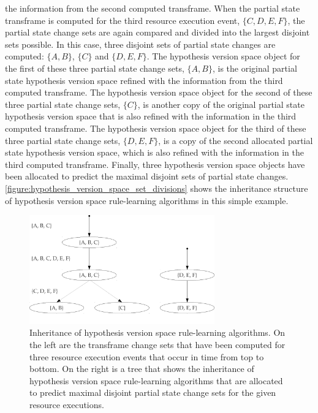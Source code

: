 the information from the second computed transframe.  When the partial
state transframe is computed for the third resource execution event,
$\{C, D, E, F\}$, the partial state change sets are again compared and
divided into the largest disjoint sets possible.  In this case, three
disjoint sets of partial state changes are computed: $\{A, B\}$,
$\{C\}$ and $\{D, E, F\}$.  The hypothesis version space object for
the first of these three partial state change sets, $\{A, B\}$, is the
original partial state hypothesis version space refined with the
information from the third computed transframe.  The hypothesis
version space object for the second of these three partial state
change sets, $\{C\}$, is another copy of the original partial state
hypothesis version space that is also refined with the information in
the third computed transframe.  The hypothesis version space object
for the third of these three partial state change sets, $\{D, E, F\}$,
is a copy of the second allocated partial state hypothesis version
space, which is also refined with the information in the third
computed transframe.  Finally, three hypothesis version space objects
have been allocated to predict the maximal disjoint sets of partial
state changes.
{\mbox{\autoref{figure:hypothesis_version_space_set_divisions}}} shows
the inheritance structure of hypothesis version space rule-learning
algorithms in this simple example.
\begin{figure}
\centering
\includegraphics[width=8cm]{gfx/hypothesis_version_space_set_divisions}
\caption[Inheritance of hypothesis version space rule-learning
  algorithms.]{Inheritance of hypothesis version space rule-learning
  algorithms.  On the left are the transframe change sets that have
  been computed for three resource execution events that occur in time
  from top to bottom.  On the right is a tree that shows the
  inheritance of hypothesis version space rule-learning algorithms
  that are allocated to predict maximal disjoint partial state change
  sets for the given resource executions.}
\label{figure:hypothesis_version_space_set_divisions}
\end{figure}




